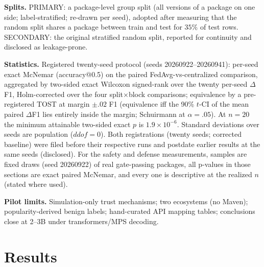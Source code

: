 \documentclass[sigconf,nonacm]{acmart}
\begin{document}
\textbf{Splits.} PRIMARY: a package-level group split (all versions of a
package on one side; label-stratified; re-drawn per seed), adopted after
measuring that the random split shares a package between train and test
for $35\%$ of test rows. SECONDARY: the original stratified random split,
reported for continuity and disclosed as leakage-prone.

\textbf{Statistics.} Registered twenty-seed protocol (seeds
20260922--20260941): per-seed exact McNemar (accuracy@0.5) on the paired
FedAvg-vs-centralized comparison, aggregated by two-sided exact Wilcoxon
signed-rank over the twenty per-seed $\Delta$F1, Holm-corrected over the
four split$\times$block comparisons; equivalence by a pre-registered TOST
at margin $\pm.02$ F1 (equivalence iff the 90\% $t$-CI of the mean paired
$\Delta$F1 lies entirely inside the margin; Schuirmann at $\alpha{=}.05$).
At $n{=}20$ the minimum attainable two-sided exact $p$ is
$1.9{\times}10^{-6}$. Standard deviations over seeds are population
($ddof{=}0$). Both registrations (twenty seeds; corrected baseline) were
filed before their respective runs and postdate earlier results at the
same seeds (disclosed). For the safety and defense measurements, samples
are fixed draws (seed 20260922) of real gate-passing packages, all
p-values in those sections are exact paired McNemar, and every one is
descriptive at the realized $n$ (stated where used).

\textbf{Pilot limits.} Simulation-only trust mechanisms; two ecosystems
(no Maven); popularity-derived benign labels; hand-curated API mapping
tables; conclusions close at 2--3B under transformers/MPS decoding.

\section{Results}\label{sec:results}
\end{document}
